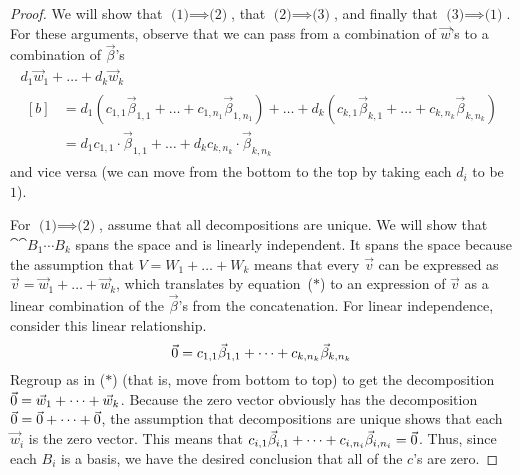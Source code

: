 \begin{proof}
We will show that $\text{(1)}\implies\text{(2)}$, 
that $\text{(2)}\implies\text{(3)}$, 
and finally that $\text{(3)}\implies\text{(1)}$.
For these arguments, observe that we can pass from a combination of 
$\vec{w}$'s to a combination of $\vec{\beta}$'s
\renewcommand{\theequation}{$*$}
\begin{multline}
  d_1\vec{w}_1+\dots+d_k\vec{w}_k                            \\
  \begin{aligned}[b]
    \mbox{}
    &= d_1(c_{1,1}\vec{\beta}_{1,1}+\dots+c_{1,n_1}\vec{\beta}_{1,n_1})
        +\dots
        +d_k(c_{k,1}\vec{\beta}_{k,1}+\dots+c_{k,n_k}\vec{\beta}_{k,n_k}) \\
    &= d_1c_{1,1}\cdot\vec{\beta}_{1,1}
        +\dots
        +d_kc_{k,n_k}\cdot\vec{\beta}_{k,n_k} 
  \end{aligned}
\end{multline}
and vice versa
(we can move from the bottom to the top by taking each $d_i$ to be $1$).

For $\text{(1)}\implies\text{(2)}$,
assume that all decompositions are unique.
We will show that $\cat{\cat{B_1}{\cdots}}{B_k}$ spans the
space and is linearly independent.
It spans the space because the assumption 
that $V=W_1+\dots+W_k$
means that every $\vec{v}$ can be expressed as 
$\vec{v}=\vec{w}_1+\dots+\vec{w}_k$, which translates by equation~($*$) to 
an expression of $\vec{v}$ as a linear combination of the $\vec{\beta}$'s
from the concatenation.
For linear independence, consider this linear relationship.
\begin{equation*}
  \vec{0}=c_{1,1}\vec{\beta}_{1,1}+\dots+c_{k,n_k}\vec{\beta}_{k,n_k}
\end{equation*}
Regroup as in ($*$) (that is, move from bottom to top) to get
the decomposition $\vec{0}=\vec{w}_1+\dots+\vec{w}_k$.
Because the zero vector obviously
has the decomposition $\vec{0}=\vec{0}+\dots+\vec{0}$,
the assumption that decompositions are unique shows that each
$\vec{w}_i$ is the zero vector.
This means that
$c_{i,1}\vec{\beta}_{i,1}+\dots+c_{i,n_i}\vec{\beta}_{i,n_i}=\vec{0}$.
Thus, since each $B_i$ is a basis, we have the desired conclusion that all of
the $c$'s are zero.


\end{proof}
